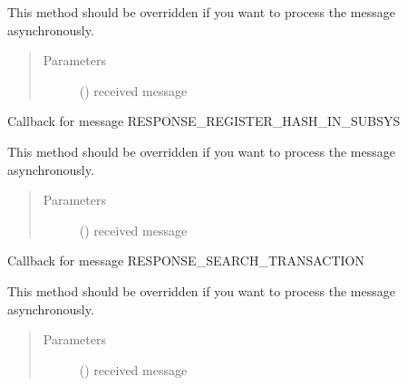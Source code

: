 \documentclass[letterpaper,10pt,english]{sphinxmanual}
\begin{document}
\begin{fulllineitems}
\begin{fulllineitems}
This method should be overridden if you want to process the message asynchronously.
\begin{quote}\begin{description}
\item[{Parameters}] \leavevmode
{} () \textendash{} received message

\end{description}\end{quote}

\end{fulllineitems}


\begin{fulllineitems}
\label{\detokenize{bbc1.core.bbc_app:bbc1.core.bbc_app.Callback.proc_resp_register_hash}}
Callback for message RESPONSE\_REGISTER\_HASH\_IN\_SUBSYS

This method should be overridden if you want to process the message asynchronously.
\begin{quote}\begin{description}
\item[{Parameters}] \leavevmode
{} () \textendash{} received message

\end{description}\end{quote}

\end{fulllineitems}


\begin{fulllineitems}
\label{\detokenize{bbc1.core.bbc_app:bbc1.core.bbc_app.Callback.proc_resp_search_transaction}}
Callback for message RESPONSE\_SEARCH\_TRANSACTION

This method should be overridden if you want to process the message asynchronously.
\begin{quote}\begin{description}
\item[{Parameters}] \leavevmode
{} () \textendash{} received message


\end{description}
\end{quote}
\end{fulllineitems}
\end{fulllineitems}
\end{document}
